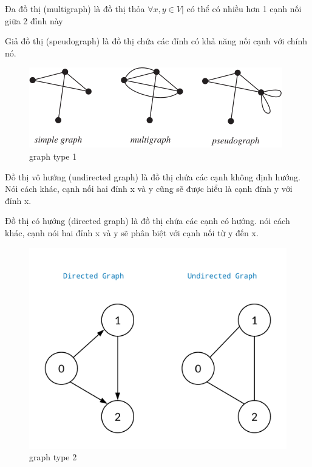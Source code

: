 Đa đồ thị (multigraph) là đồ thị thỏa $\forall x,y \in V | $ có thể có nhiều hơn 1 cạnh nối giữa 2 đỉnh này 

Giả đồ thị (speudograph) là đồ thị chứa các đỉnh có khả năng nối cạnh với chính nó.

\begin{figure}[H]
    \begin{center}
        \includegraphics[scale=0.8]{images/graph-type-1}
        \caption{graph type 1}
        \label{fig:graph-type-1}
    \end{center}
\end{figure}

Đồ thị vô hướng (undirected graph) là đồ thị chứa các cạnh không định hướng. Nói cách khác, cạnh nối hai đỉnh x và y cũng sẽ được hiểu là cạnh đỉnh y với đỉnh x.

Đồ thị có hướng (directed graph) là đồ thị chứa các cạnh có hướng. nói cách khác, cạnh nói hai đỉnh x và y sẽ phân biệt với cạnh nối từ y đến x.

\begin{figure}[H]
    \begin{center}
        \includegraphics[scale=0.2]{images/graph-type-2}
        \caption{graph type 2}
        \label{fig:graph-type-2}
    \end{center}
\end{figure}


